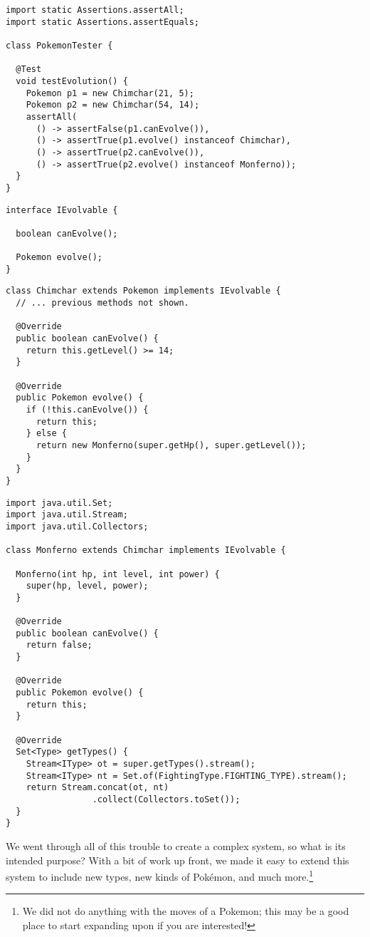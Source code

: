 \begin{lstlisting}[language=MyJava]
import static Assertions.assertAll;
import static Assertions.assertEquals;

class PokemonTester {

  @Test 
  void testEvolution() {
    Pokemon p1 = new Chimchar(21, 5);
    Pokemon p2 = new Chimchar(54, 14);
    assertAll(
      () -> assertFalse(p1.canEvolve()),
      () -> assertTrue(p1.evolve() instanceof Chimchar),
      () -> assertTrue(p2.canEvolve()),
      () -> assertTrue(p2.evolve() instanceof Monferno));
  }
}
\end{lstlisting}

\begin{lstlisting}[language=MyJava]
interface IEvolvable {

  boolean canEvolve();

  Pokemon evolve();
}
\end{lstlisting}

\begin{lstlisting}[language=MyJava]
class Chimchar extends Pokemon implements IEvolvable {
  // ... previous methods not shown.

  @Override
  public boolean canEvolve() {
    return this.getLevel() >= 14;
  }

  @Override
  public Pokemon evolve() {
    if (!this.canEvolve()) {
      return this;
    } else {
      return new Monferno(super.getHp(), super.getLevel());
    }
  }
}
\end{lstlisting}

\begin{lstlisting}[language=MyJava]
import java.util.Set;
import java.util.Stream;
import java.util.Collectors;

class Monferno extends Chimchar implements IEvolvable {

  Monferno(int hp, int level, int power) {
    super(hp, level, power);
  }

  @Override 
  public boolean canEvolve() {
    return false;
  }

  @Override
  public Pokemon evolve() {
    return this;
  }

  @Override
  Set<Type> getTypes() {
    Stream<IType> ot = super.getTypes().stream();
    Stream<IType> nt = Set.of(FightingType.FIGHTING_TYPE).stream();
    return Stream.concat(ot, nt)
                 .collect(Collectors.toSet());
  }
}
\end{lstlisting}

We went through all of this trouble to create a complex system, so what is its intended purpose? With a bit of work up front, we made it easy to extend this system to include new types, new kinds of Pok\'emon, and much more.\footnote{We did not do anything with the moves of a Pokemon; this may be a good place to start expanding upon if you are interested!}